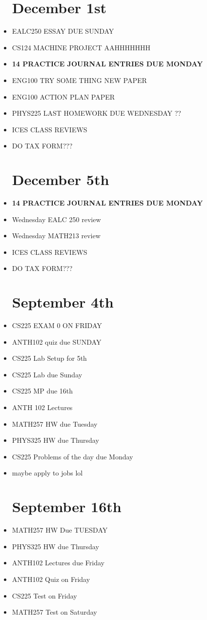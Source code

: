 \documentclass{report}
\newcommand{\done}{\textbf{\checkmark}}
\begin{document}
\begin{itemize}
\chapter{December 1st}
\item
EALC250 ESSAY DUE SUNDAY \done
\item
CS124 MACHINE PROJECT AAHHHHHHH \done
\item
\textbf{ 14 PRACTICE JOURNAL ENTRIES DUE MONDAY }
\item
ENG100 TRY SOME THING NEW PAPER \done
\item
ENG100 ACTION PLAN PAPER \done
\item
PHYS225 LAST HOMEWORK DUE WEDNESDAY \done ??
\item
ICES CLASS REVIEWS
\item
DO TAX FORM???


\chapter{December 5th}
\item
\textbf{ 14 PRACTICE JOURNAL ENTRIES DUE MONDAY } \done
\item
Wednesday EALC 250 review \done
\item
Wednesday MATH213 review \done
\item
ICES CLASS REVIEWS
\item
DO TAX FORM???




\chapter{September 4th}
\item
CS225 EXAM 0 ON FRIDAY 
\item
ANTH102 quiz due SUNDAY
\item
CS225 Lab Setup for 5th \done
\item
CS225 Lab due Sunday \done
\item
CS225 MP due 16th
\item 
ANTH 102 Lectures \done
\item
MATH257 HW due Tuesday \done
\item
PHYS325 HW due Thursday
\item
CS225 Problems of the day due Monday 
\item
maybe apply to jobs lol

\chapter{September 16th}
\item
MATH257 HW Due TUESDAY 
\item
PHYS325 HW due Thursday
\item
ANTH102 Lectures due Friday 
\item 
ANTH102 Quiz on Friday 
\item 
CS225 Test on Friday 
\item 
MATH257 Test on Saturday





\end{itemize}
\end{document}

